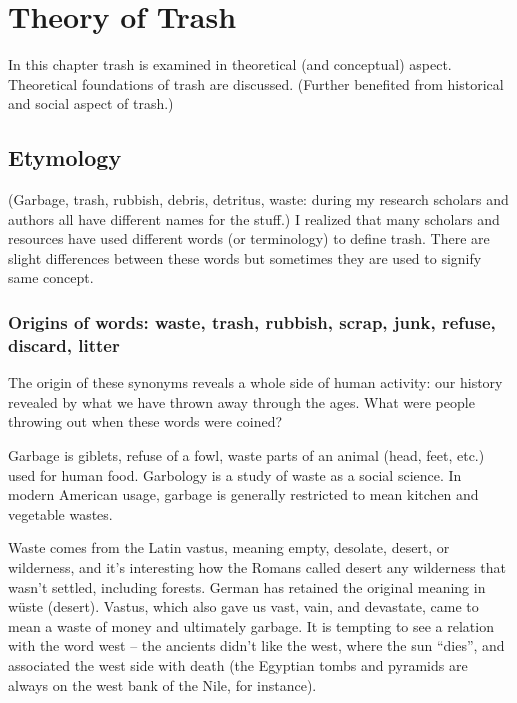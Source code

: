 \chapter{Theory of Trash}
In this chapter trash is examined in theoretical (and conceptual) aspect. Theoretical foundations of trash are discussed. (Further benefited from historical and social aspect of trash.)

\section{Etymology}
(Garbage, trash, rubbish, debris, detritus, waste: during my research scholars and authors all have different names for the stuff.) I realized that many scholars and resources have used different words (or terminology) to define trash. There are slight differences between these words but sometimes they are used to signify same concept. 

\subsection{Origins of words: waste, trash, rubbish, scrap, junk, refuse, discard, litter}
The origin of these synonyms reveals a whole side of human activity: our history revealed by what we have thrown away through the ages. What were people throwing out when these words were coined? 

Garbage is giblets, refuse of a fowl, waste parts of an animal (head, feet, etc.) used for human food. Garbology is a study of waste as a social science. In modern American usage, garbage is generally restricted to mean kitchen and vegetable wastes.

Waste comes from the Latin vastus, meaning empty, desolate, desert, or wilderness, and it’s interesting how the Romans called desert any wilderness that wasn’t settled, including forests.  German has retained the original meaning in wüste (desert). Vastus, which also gave us vast, vain, and devastate, came to mean a waste of money and ultimately garbage.  It is tempting to see a relation with the word west – the ancients didn’t like the west, where the sun “dies”, and associated the west side with death (the Egyptian tombs and pyramids are always on the west bank of the Nile, for instance)\cite{paul2013garbage}.

